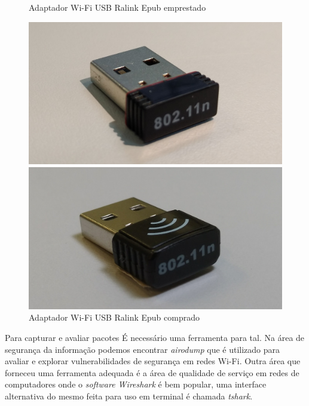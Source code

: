 \begin{figure}[htb]
 \label{adaptadores-usb-2}
  \begin{minipage}{0.45\textwidth}
	  \centering
	  \caption{Adaptador Wi-Fi USB Ralink Epub emprestado \label{fig-ralink-epub}}
	  \includegraphics[width=1\textwidth]{040-plataformas/RPi-WiFi-dongles/cut_ralink-epub.jpg}
  \end{minipage}
  \hfill
  \begin{minipage}{0.45\textwidth}
	  \centering
	  \caption{Adaptador Wi-Fi USB Ralink Epub comprado \label{fig-ralink}}
	  \includegraphics[width=1\textwidth]{040-plataformas/RPi-WiFi-dongles/cut_ralink.jpg}
  \end{minipage}
\end{figure}


Para capturar e avaliar pacotes É necessário uma ferramenta  para tal. Na área
de segurança da informação podemos encontrar \emph{airodump} que é utilizado para
avaliar e explorar vulnerabilidades de segurança em redes Wi-Fi. Outra área que
forneceu uma ferramenta adequada é a área de qualidade de serviço em redes de
computadores onde o \emph{software Wireshark} é bem popular, uma interface alternativa
do mesmo feita para uso em terminal é chamada \emph{tshark}.

